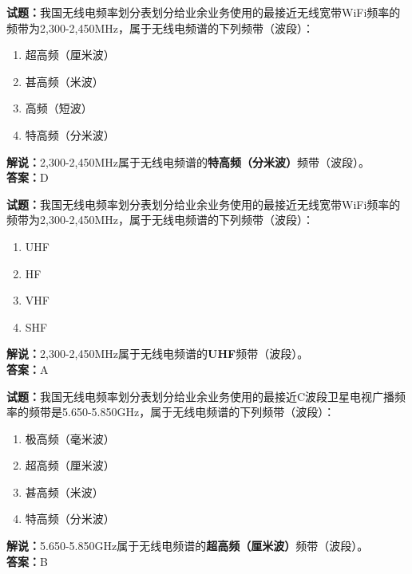 \documentclass{ctexbook}
\begin{document}
\vspace{1em}

\textbf{试题：}我国无线电频率划分表划分给业余业务使用的最接近无线宽带WiFi频率的频带为2,300-2,450\unit{\MHz}，属于无线电频谱的下列频带（波段）：
\begin{enumerate}[leftmargin=3em]
  \item 超高频（厘米波）
  \item 甚高频（米波）
  \item 高频（短波）
  \item 特高频（分米波）
\end{enumerate}
\noindent\textbf{解说：}2,300-2,450\unit{\MHz}属于无线电频谱的\textbf{特高频（分米波）}频带（波段）。\\\noindent\textbf{答案：}D


\vspace{1em}

\textbf{试题：}我国无线电频率划分表划分给业余业务使用的最接近无线宽带WiFi频率的频带为2,300-2,450\unit{\MHz}，属于无线电频谱的下列频带（波段）：
\begin{enumerate}[leftmargin=3em]
  \item UHF
  \item HF
  \item VHF
  \item SHF
\end{enumerate}
\noindent\textbf{解说：}2,300-2,450\unit{\MHz}属于无线电频谱的\textbf{UHF}频带（波段）。\\\noindent\textbf{答案：}A


\vspace{1em}

\textbf{试题：}我国无线电频率划分表划分给业余业务使用的最接近C波段卫星电视广播频率的频带是5.650-5.850\unit{\GHz}，属于无线电频谱的下列频带（波段）：
\begin{enumerate}[leftmargin=3em]
  \item 极高频（毫米波）
  \item 超高频（厘米波）
  \item 甚高频（米波）
  \item 特高频（分米波）
\end{enumerate}
\noindent\textbf{解说：}5.650-5.850\unit{\GHz}属于无线电频谱的\textbf{超高频（厘米波）}频带（波段）。\\\noindent\textbf{答案：}B


\vspace{1em}
\end{document}
